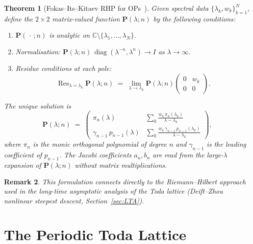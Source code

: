 \documentclass[12pt,a4paper]{article}
\newtheorem{theorem}{Theorem}[section]
\newtheorem{remark}[theorem]{Remark}
\theoremstyle{definition}
\newcommand{\C}{\mathbb{C}}
\newcommand{\Res}{\operatorname{Res}}
\newcommand{\diag}{\operatorname{diag}}
\begin{document}
\begin{theorem}[Fokas--Its--Kitaev RHP for OPs~\cite{FokasItsKitaev1992,Miller2018}]
Given spectral data $\{\lambda_k,w_k\}_{k=1}^N$, define the
$2\times 2$ matrix-valued function $\mathbf{P}(\lambda;n)$ by the
following conditions:
\begin{enumerate}[label=(\roman*)]
  \item $\mathbf{P}(\,\cdot\,;n)$ is analytic on $\C\setminus\{\lambda_1,\ldots,\lambda_N\}$.
  \item Normalisation: $\mathbf{P}(\lambda;n)\,\diag(\lambda^{-n},\lambda^{n})\to I$
        as $\lambda\to\infty$.
  \item Residue conditions at each pole:
        \[
          \Res_{\lambda=\lambda_k}\mathbf{P}(\lambda;n)
          \;=\; \lim_{\lambda\to\lambda_k}\mathbf{P}(\lambda;n)
                \begin{pmatrix}0 & w_k \\ 0 & 0\end{pmatrix}.
        \]
\end{enumerate}
The unique solution is
\begin{equation}\label{eq:FIK}
  \mathbf{P}(\lambda;n) \;=\;
  \begin{pmatrix}
    \pi_n(\lambda) &
    \displaystyle\sum_k \frac{w_k\,\pi_n(\lambda_k)}{\lambda-\lambda_k}\\[8pt]
    \gamma_{n-1}\,p_{n-1}(\lambda) &
    \displaystyle\sum_k \frac{w_k\,\gamma_{n-1}\,p_{n-1}(\lambda_k)}{\lambda-\lambda_k}
  \end{pmatrix},
\end{equation}
where $\pi_n$ is the monic orthogonal polynomial of degree $n$ and
$\gamma_{n-1}$ is the leading coefficient of $p_{n-1}$.
The Jacobi coefficients $a_n,b_n$ are read from the large-$\lambda$
expansion of $\mathbf{P}(\lambda;n)$ without matrix multiplications.
\end{theorem}

\begin{remark}
This formulation connects directly to the Riemann--Hilbert approach used
in the long-time asymptotic analysis of the Toda lattice (Deift--Zhou
nonlinear steepest descent,  Section~\ref{sec:LTA}).
\end{remark}

\section{The Periodic Toda Lattice}
\end{document}
